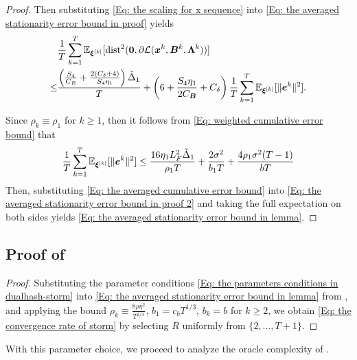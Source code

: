 \begin{proof}
    Then substituting \eqref{Eq: the scaling for x sequence} into \eqref{Eq: the averaged stationarity error bound in proof}
    yields
    \begin{align}
             & \frac{1}{T}\sum\limits_{ k =1}^{T} \mathbb{E}_{\bm{\xi}^{[k]}}[\text{dist}^{2}(\bm{0}, \partial \mathcal{L}(\bm{x}^{k}, \bm{B}^{k}, \bm{\Lambda}^{k}))] \notag                                                                                                                                                     \\
        \leq & \frac{ \left( \frac{S_4}{C_B}+ \frac{2(C_{\delta}+ 4)}{S_4\eta_1}\right)\tilde{\Delta}_{1}}{ T}+\left( 6+ \frac{S_{4}\eta_{1}}{2C_{\bm{B}}}+ C_{\delta}\right)\frac{1}{T}\sum\limits_{ k =1}^{T} \mathbb{E}_{\bm{\xi}^{[k]}}[\| \bm{e}^{k}\|^{2}].\label{Eq: the averaged stationarity error bound in proof 2}
    \end{align}

    Since $\rho_{k}\equiv \rho_{1}$ for $k \geq 1$, then it follows from \eqref{Eq: weighted cumulative error bound}
    that
    \begin{align}
        \label{Eq: the averaged cumulative error bound}\frac{1}{T}\sum\limits_{ k =1}^{T} \mathbb{E}_{\bm{\xi}^{[k]}}[\| \bm{e}^{k}\|^{2}]\leq \frac{16 \eta_{1}L_{F}^{2}\tilde{\Delta}_{1}}{\rho_{1}T}+ \frac{2\sigma^{2}}{b_{1}T}+ \frac{4\rho_{1}\sigma^{2}(T-1)}{bT}
    \end{align}
    Then, substituting \eqref{Eq: the averaged cumulative error bound} into \eqref{Eq: the averaged stationarity error bound in proof 2}
    and taking the full expectation on both sides yields \eqref{Eq: the averaged stationarity error bound in lemma}.
\end{proof}

\subsection{Proof of }
\label{Subsubsec: convergence rate STORM}
\begin{proof}
    Substituting the parameter conditions \eqref{Eq: the parameters conditions in dualhash-storm} into \eqref{Eq: the averaged stationarity error bound in lemma} from , and applying the bound $\rho_k \equiv \frac{8\rho\eta^2}{T^{2/3}}$, $b_1 = c_b T^{1/3}$, $b_k = b$ for $k \geq 2$, we obtain \eqref{Eq: the convergence rate of storm} by selecting $R$ uniformly from $\{2,\ldots,T+1\}$.
\end{proof}
With this parameter choice, we proceed to analyze the oracle complexity of .
